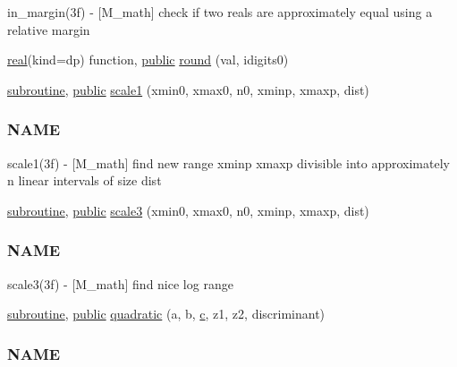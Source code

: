 \begin{DoxyCompactItemize}
\begin{DoxyCompactList}
in\+\_\+margin(3f) -\/ \mbox{[}M\+\_\+math\mbox{]} check if two reals are approximately equal using a relative margin \end{DoxyCompactList}\item 
\hyperlink{read__watch_83_8txt_abdb62bde002f38ef75f810d3a905a823}{real}(kind=dp) function, \hyperlink{M__stopwatch_83_8txt_a2f74811300c361e53b430611a7d1769f}{public} \hyperlink{namespacem__math_a11ed560b0452d8338ff4958a88cab4de}{round} (val, idigits0)
\item 
\hyperlink{M__stopwatch_83_8txt_acfbcff50169d691ff02d4a123ed70482}{subroutine}, \hyperlink{M__stopwatch_83_8txt_a2f74811300c361e53b430611a7d1769f}{public} \hyperlink{namespacem__math_aa12c4a23dac498e04f8bff1340fc8b30}{scale1} (xmin0, xmax0, n0, xminp, xmaxp, dist)
\begin{DoxyCompactList}\small\item\em \subsubsection*{N\+A\+ME}

scale1(3f) -\/ \mbox{[}M\+\_\+math\mbox{]} find new range xminp xmaxp divisible into approximately n linear intervals of size dist \end{DoxyCompactList}\item 
\hyperlink{M__stopwatch_83_8txt_acfbcff50169d691ff02d4a123ed70482}{subroutine}, \hyperlink{M__stopwatch_83_8txt_a2f74811300c361e53b430611a7d1769f}{public} \hyperlink{namespacem__math_a2cf8b035165dd4c2c2ad0af1709dadfb}{scale3} (xmin0, xmax0, n0, xminp, xmaxp, dist)
\begin{DoxyCompactList}\small\item\em \subsubsection*{N\+A\+ME}

scale3(3f) -\/ \mbox{[}M\+\_\+math\mbox{]} find nice log range \end{DoxyCompactList}\item 
\hyperlink{M__stopwatch_83_8txt_acfbcff50169d691ff02d4a123ed70482}{subroutine}, \hyperlink{M__stopwatch_83_8txt_a2f74811300c361e53b430611a7d1769f}{public} \hyperlink{namespacem__math_a59bbb085b083b802178b8de41c9bb343}{quadratic} (a, b, \hyperlink{c_8f90_aeb1f4e639be0213b4cbd07f2583a5b1f}{c}, z1, z2, discriminant)
\begin{DoxyCompactList}\small\item\em \subsubsection*{N\+A\+ME}


\end{DoxyCompactList}
\end{DoxyCompactItemize}
